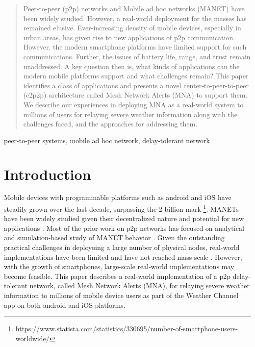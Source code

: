 \documentclass[conference]{IEEEtran}
\begin{document}
\begin{abstract}
Peer-to-peer (p2p) networks and Mobile ad hoc networks (MANET) have
been widely studied. However, a real-world deployment for the masses
has remained elusive. Ever-increasing density of mobile devices,
especially in urban areas, has given rise to new applications of p2p
communication. However, the modern smartphone platforms have limited
support for such communications. Further, the issues of battery life,
range, and trust remain unaddressed. A key question then is, what
kinds of applications can the modern mobile platforms support and what
challenges remain? This paper identifies a class of applications and
presents a novel center-to-peer-to-peer (c2p2p) architecture called
Mesh Network Alerts (MNA) to support them.  We describe our
experiences in deploying MNA as a real-world system to millions of
users for relaying severe weather information along with the
challenges faced, and the approaches for addressing them.
\end{abstract}

\begin{IEEEkeywords}
peer-to-peer systems, mobile ad hoc network, delay-tolerant network
\end{IEEEkeywords}

\section{Introduction}
Mobile devices with programmable platforms such as android and iOS
have steadily grown over the last decade, surpassing the 2 billion
mark \footnote{https://www.statista.com/statistics/330695/number-of-smartphone-users-worldwide/}. MANETs
have been widely studied given their decentralized nature and
potential for new applications
\cite{loo-manet-2011,perkins-ad-hoc-2001}. Most of the prior work on
p2p networks has focused on analytical and simulation-based study of
MANET behavior
\cite{zhang-topology-manet-2015,marti-misbehavior-manet-2000,mauve-pos-routing-manet-2001}. Given
the outstanding practical challenges in deployoing a large number of
physical nodes, real-world implementations have been limited and have
not reached mass scale \cite{kiess-manet-impl-2007}. However, with the
growth of smartphones, large-scale real-world implementations may
become feasible. This paper describes a real-world implementation of a
p2p delay-tolerant network, called Mesh Network Alerts (MNA), for
relaying severe weather information to millions of mobile device users
as part of the Weather Channel app \cite{mna} on both android and iOS
platforms.
\end{document}

